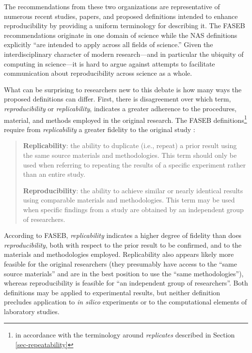The recommendations from these two organizations are representative of numerous recent studies, papers, 
	and proposed definitions intended to enhance reproducibility by providing a uniform terminology
	for describing it.  
The FASEB recommendations originate in one domain of science while the NAS definitions explicitly 
	``are intended to apply across all fields of science.''
Given the interdisciplinary character of modern research---and in particular the ubiquity of computing in science---it 
	is hard to argue against attempts to facilitate communication about reproducibility across science as a whole.

What can be surprising to researchers new to this debate is how many ways the proposed definitions
	can differ.
First, there is disagreement over which term, \emph{reproducibility} or \emph{replicability}, indicates
	 a greater adherence to the procedures, material,  and methods employed in the original research.
The FASEB definitions\footnote{in accordance with the terminology around \emph{replicates} described in Section\,\ref{sec-repeatability}}
	require from \emph{replicability} a greater fidelity to the original study \cite[p.3]{FASEB2016enhancing}:
        \begin{quote}
          \textbf{Replicability}: the ability to duplicate (i.e., repeat) a prior result using the same
          source materials and methodologies. This term should only be used when
	referring to repeating the results of a specific experiment rather than an
	entire study. \medskip

	\textbf{Reproducibility}: the ability to achieve similar or nearly identical results using comparable materials and methodologies.
	This term may be used when specific findings from a study are obtained by an independent group of researchers.
      \end{quote}
According to FASEB, \emph{replicability} indicates a higher degree of fidelity than does \emph{reproducibility}, 
	both with respect to the prior result to be confirmed, and to the materials and methodologies employed.
Replicability also appears likely more feasible for the original researchers (they presumably have access to the 
	``same source materials'' and are in the best position to use the ``same methodologies''), whereas reproducibility is 
	feasible for ``an independent group of researchers''. 
Both definitions may be applied to experimental results, but neither definition precludes application to \emph{in silico} 
	experiments or to the computational elements of laboratory studies.

